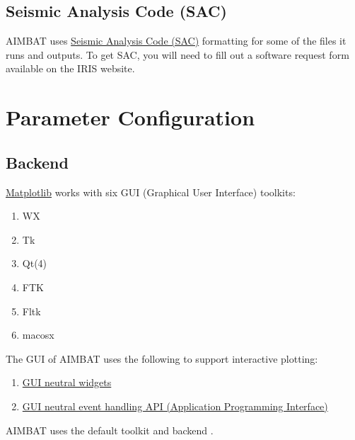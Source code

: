 \documentclass[letterpaper,10pt,english]{sphinxmanual}
\begin{document}
\section{Seismic Analysis Code (SAC)}
\label{docfiles/analyzingData:seismic-analysis-code-sac}
AIMBAT uses \href{http://www.iris.edu/files/sac-manual/}{Seismic Analysis Code (SAC)} formatting for some of the files it runs and outputs. To get SAC, you will need to fill out a software request form available on the IRIS website.


\chapter{Parameter Configuration}
\label{docfiles/parameterConfiguration:parameter-configuration}\label{docfiles/parameterConfiguration::doc}

\section{Backend}
\label{docfiles/parameterConfiguration:backend}
\href{http://matplotlib.org/contents.html}{Matplotlib} works with six GUI (Graphical User Interface) toolkits:
\begin{enumerate}
\item {} 
WX

\item {} 
Tk

\item {} 
Qt(4)

\item {} 
FTK

\item {} 
Fltk

\item {} 
macosx

\end{enumerate}

The GUI of AIMBAT uses the following to support interactive plotting:
\begin{enumerate}
\item {} 
\href{http://matplotlib.org/api/widgets\_api.html}{GUI neutral widgets}

\item {} 
\href{http://matplotlib.org/users/event\_handling.html}{GUI neutral event handling API (Application Programming Interface)}

\end{enumerate}

AIMBAT uses the default toolkit  and backend .
\end{document}

